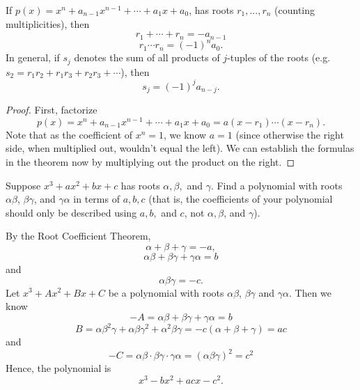 \documentclass[11pt,dvipsnames]{book}
\numberwithin{equation}{section} %
\numberwithin{figure}{section} %
\numberwithin{table}{section} %
\begin{document}
\begin{theorem} If $p(x)=x^{n}+a_{n-1}x^{n-1}+\cdots + a_{1}x+a_{0}$, has roots $r_{1},...,r_{n}$ (counting multiplicities), then
\[
r_{1}+\cdots + r_{n} = -a_{n-1} \]
\[
r_{1}\cdots r_{n} = (-1)^{n}a_{0}.\]
In general, if $s_{j}$ denotes the sum of all products of $j$-tuples of the roots (e.g. $s_{2} = r_{1}r_{2}+r_{1}r_{3}+r_{2}r_{3}+\cdots $), then
\[
s_{j} = (-1)^{j}a_{n-j}.
\]

\end{theorem}

\begin{proof}

First, factorize
\[
p(x)=x^{n}+a_{n-1}x^{n-1}+\cdots + a_{1}x+a_{0}=a(x-r_{1})\cdots (x-r_{n}).\]
Note that as the coefficient of $x^{n}=1$, we know $a=1$ (since otherwise the right side, when multiplied out, wouldn't equal the left). We can establish the formulas in the theorem now by multiplying out the product on the right.
\end{proof}







\begin{example}
Suppose $x^{3}+ax^{2}+bx+c$ has roots $\alpha,\beta,$ and $\gamma$. Find a polynomial with roots $\alpha\beta$, $\beta\gamma$, and $\gamma\alpha$ in terms of $a,b,c$ (that is, the coefficients of your polynomial should only be described using $a,b,$ and $c$, not $\alpha,\beta$, and $\gamma$). 

By the Root Coefficient Theorem,
\[
\alpha+\beta+\gamma = -a,
\]
\[
\alpha\beta+\beta\gamma+\gamma\alpha = b\]
and 
\[
\alpha\beta\gamma = -c.\]
Let $x^{3}+Ax^{2}+Bx+C$ be a polynomial with roots $\alpha\beta$, $\beta\gamma$ and $\gamma\alpha$. Then we know
\[
-A=\alpha\beta+\beta\gamma+\gamma\alpha = b\]
\[
B=\alpha\beta^{2}\gamma+\alpha\beta\gamma^{2}+\alpha^{2}\beta\gamma=-c(\alpha+\beta+\gamma)=ac
\]
and 
\[
-C=\alpha\beta \cdot \beta\gamma\cdot \gamma\alpha 
 = (\alpha\beta\gamma)^{2}=c^{2}
 \]
 Hence, the polynomial is 
 \[
 x^{3}-bx^{2}+acx-c^{2}.
 \]
\end{example}
 
\end{document}
